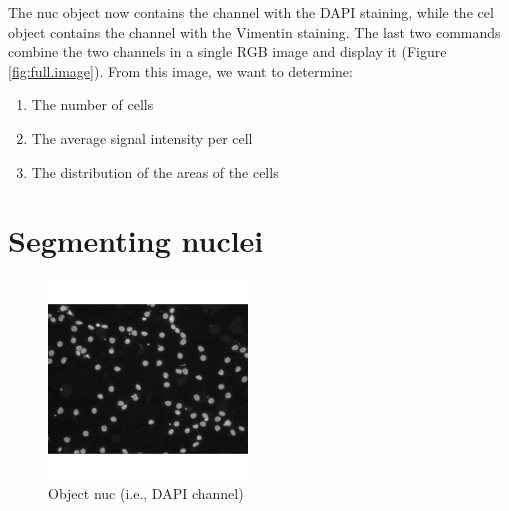 \documentclass{article}\usepackage[]{graphicx}\usepackage[]{color}
\newenvironment{knitrout}{}{} %
\begin{document}
The nuc object now contains the channel with the DAPI staining, while the cel object contains the channel with the Vimentin staining.
The last two commands combine the two channels in a single RGB image and display it (Figure \ref{fig:full.image}). From this image, we want to determine:
\begin{enumerate}
  \item The number of cells
  \item The average signal intensity per cell
  \item The distribution of the areas of the cells
\end{enumerate}

\section{Segmenting nuclei}
\begin{knitrout}
\color{fgcolor}\begin{figure}[]


{\centering \includegraphics[width=200px]{knit_figure/figdapi} 

}

\caption[Object nuc (i]{Object nuc (i.e., DAPI channel)\label{fig:dapi}}
\end{figure}


\end{knitrout}
\end{document}
